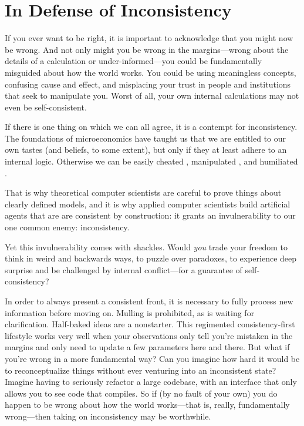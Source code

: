 

\section{In Defense of Inconsistency}

If you ever want to be right, it is important to acknowledge that you might now be wrong.  And not only might you be wrong in the margins---wrong about the details of a calculation or under-informed---you could be fundamentally misguided about how the world works. You could be using meaningless concepts, confusing cause and effect, and misplacing your trust in people and institutions that seek to manipulate you. Worst of all, your own internal calculations may not even be self-consistent.

If there is one thing on which we can all agree, it is a contempt for inconsistency.
The foundations of microeconomics have taught us that we are entitled to our own tastes (and beliefs, to some extent), but only if they at least adhere to an internal logic.
Otherwise we can be easily cheated \cite{RAT}, manipulated \cite{explosion}, and humiliated \cite{logicalfalacy, emptysetthesis}.

That is why theoretical computer scientists are careful to prove things about clearly defined models,
and it is why applied computer scientists build artificial agents that are are consistent by construction:
  it grants an invulnerability to our one common enemy: inconsistency.

Yet this invulnerability comes with shackles.
Would \emph{you} trade your freedom to think in weird and backwards ways, to puzzle over paradoxes, to experience deep surprise and be challenged by internal conflict---for a guarantee of self-consistency?

In order to always present a consistent front, it is necessary to fully process new information before moving on. Mulling is prohibited, as
is waiting for clarification.
Half-baked ideas are a nonstarter.
This regimented consistency-first lifestyle works very well when your observations only tell you're mistaken in the margins and only need to update a few parameters here and there.
But what if you're wrong in a more fundamental way?
Can you imagine how hard it would be to reconceptualize things without ever venturing into an inconsistent state?
Imagine having to seriously refactor a large codebase, with an interface that only allows you to see code that compiles.
So if (by no fault of your own) you do happen to be wrong about how the world works---that is, really, fundamentally wrong---then taking on inconsistency may be worthwhile.

